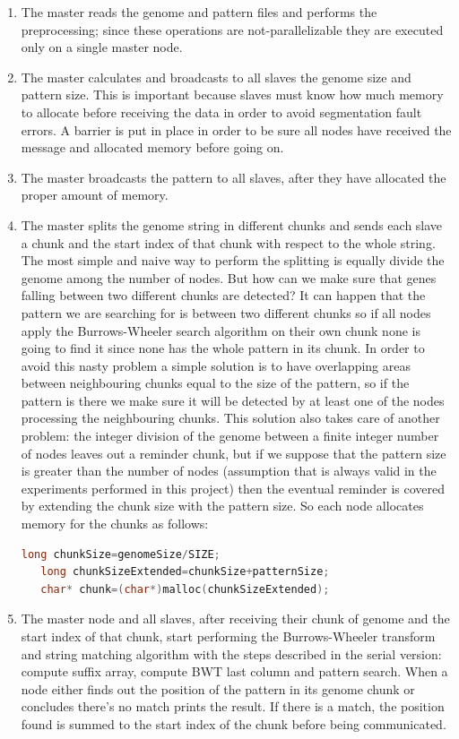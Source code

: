 \documentclass[final,5p,times,twocolumn,authoryear]{elsarticle}
\begin{document}
\begin{enumerate}
   \item The master reads the genome and pattern files and performs the preprocessing; since these operations are not-parallelizable they are executed only on a single master node.
   \item The master calculates and broadcasts to all slaves the genome size and pattern size. This is important because slaves must know how much memory to allocate before receiving the data in order to avoid segmentation fault errors. A barrier is put in place in order to be sure all nodes have received the message and allocated memory before going on.
   \item The master broadcasts the pattern to all slaves, after they have allocated the proper amount of memory.
   \item The master splits the genome string in different chunks and sends each slave a chunk and the start index of that chunk with respect to the whole string. The most simple and naive way to perform the splitting is equally divide the genome among the number of nodes. But how can we make sure that genes falling between two different chunks are detected? It can happen that the pattern we are searching for is between two different chunks so if all nodes apply the Burrows-Wheeler search algorithm on their own chunk none is going to find it since none has the whole pattern in its chunk. In order to avoid this nasty problem a simple solution is to have overlapping areas between neighbouring chunks equal to the size of the pattern, so if the pattern is there we make sure it will be detected by at least one of the nodes processing the neighbouring chunks. This solution also takes care of another problem: the integer division of the genome between a finite integer number of nodes leaves out a reminder chunk, but if we suppose that the pattern size is greater than the number of nodes (assumption that is always valid in the experiments performed in this project) then the eventual reminder is covered by extending the chunk size with the pattern size. So each node allocates memory for the chunks as follows:
   \begin{lstlisting}[language=c++]
   long chunkSize=genomeSize/SIZE;
   long chunkSizeExtended=chunkSize+patternSize;
   char* chunk=(char*)malloc(chunkSizeExtended);
   \end{lstlisting}
   \item The master node and all slaves, after receiving their chunk of genome and the start index of that chunk, start performing the Burrows-Wheeler transform and string matching algorithm with the steps described in the serial version: compute suffix array, compute BWT last column and pattern search. When a node either finds out the position of the pattern in its genome chunk or concludes there's no match prints the result. If there is a match, the position found is summed to the start index of the chunk before being communicated.
\end{enumerate}
\end{document}
